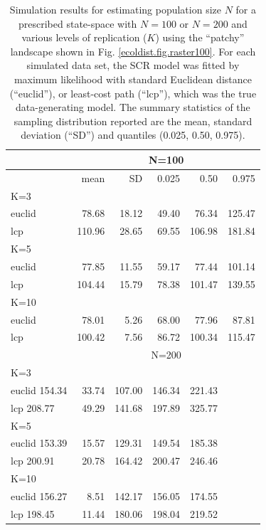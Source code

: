 \begin{table}[htp]
\label{tab.results1}
{\small
\caption{
Simulation results for estimating population size $N$ for a prescribed state-space with
$N=100$ or $N=200$ and various levels of replication ($K$)
using the ``patchy'' landscape shown in Fig.
 \ref{ecoldist.fig.raster100}.
For each simulated
data set, the SCR model was fitted by maximum likelihood with
standard Euclidean distance (``euclid''), or least-cost path
(``lcp''), which was the true data-generating model.
The summary statistics of the
sampling distribution reported are the mean, standard deviation
(``SD'') and quantiles (0.025, 0.50, 0.975).
}
\begin{tabular}{l|rrrrr}
         & \multicolumn{5}{c}{N=100  }  \\ \hline
         &   mean &  SD  & 0.025 & 0.50  & 0.975   \\ \hline
K=3      &        &      &       &       &         \\
euclid   &  78.68 & 18.12& 49.40 & 76.34 & 125.47  \\
lcp      & 110.96 & 28.65& 69.55 &106.98 & 181.84  \\
K=5      &        &      &       &       &         \\
euclid   &  77.85 & 11.55& 59.17 & 77.44 & 101.14  \\
lcp      & 104.44 & 15.79& 78.38 &101.47 & 139.55  \\
K=10     &        &      &       &       &         \\
euclid   &  78.01 & 5.26 & 68.00 & 77.96 & 87.81   \\
lcp      & 100.42 & 7.56 & 86.72 &100.34 & 115.47  \\ \hline
        & \multicolumn{5}{c}{N=200   }  \\ \hline
K=3      &        &      &       &       &         \\
euclid  154.34& 33.74& 107.00& 146.34& 221.43\\
lcp     208.77& 49.29& 141.68& 197.89& 325.77\\
K=5           &      &       &       &        \\
euclid   153.39& 15.57& 129.31& 149.54& 185.38\\
lcp      200.91& 20.78& 164.42& 200.47& 246.46\\
K=10           &      &       &       &       \\
euclid   156.27&  8.51& 142.17& 156.05& 174.55\\
lcp      198.45& 11.44& 180.06& 198.04& 219.52\\ \hline
\end{tabular}
}
\label{ecoldist.tab.simresults}
\end{table}














